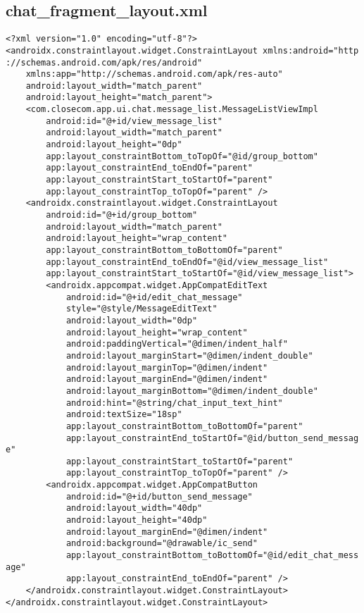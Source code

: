 \documentclass[listing]{espd}
\begin{document}
\subsection{chat\_fragment\_layout.xml}
\begin{verbatim}
<?xml version="1.0" encoding="utf-8"?>
<androidx.constraintlayout.widget.ConstraintLayout xmlns:android="http
://schemas.android.com/apk/res/android"
    xmlns:app="http://schemas.android.com/apk/res-auto"
    android:layout_width="match_parent"
    android:layout_height="match_parent">
    <com.closecom.app.ui.chat.message_list.MessageListViewImpl
        android:id="@+id/view_message_list"
        android:layout_width="match_parent"
        android:layout_height="0dp"
        app:layout_constraintBottom_toTopOf="@id/group_bottom"
        app:layout_constraintEnd_toEndOf="parent"
        app:layout_constraintStart_toStartOf="parent"
        app:layout_constraintTop_toTopOf="parent" />
    <androidx.constraintlayout.widget.ConstraintLayout
        android:id="@+id/group_bottom"
        android:layout_width="match_parent"
        android:layout_height="wrap_content"
        app:layout_constraintBottom_toBottomOf="parent"
        app:layout_constraintEnd_toEndOf="@id/view_message_list"
        app:layout_constraintStart_toStartOf="@id/view_message_list">
        <androidx.appcompat.widget.AppCompatEditText
            android:id="@+id/edit_chat_message"
            style="@style/MessageEditText"
            android:layout_width="0dp"
            android:layout_height="wrap_content"
            android:paddingVertical="@dimen/indent_half"
            android:layout_marginStart="@dimen/indent_double"
            android:layout_marginTop="@dimen/indent"
            android:layout_marginEnd="@dimen/indent"
            android:layout_marginBottom="@dimen/indent_double"
            android:hint="@string/chat_input_text_hint"
            android:textSize="18sp"
            app:layout_constraintBottom_toBottomOf="parent"
            app:layout_constraintEnd_toStartOf="@id/button_send_messag
e"
            app:layout_constraintStart_toStartOf="parent"
            app:layout_constraintTop_toTopOf="parent" />
        <androidx.appcompat.widget.AppCompatButton
            android:id="@+id/button_send_message"
            android:layout_width="40dp"
            android:layout_height="40dp"
            android:layout_marginEnd="@dimen/indent"
            android:background="@drawable/ic_send"
            app:layout_constraintBottom_toBottomOf="@id/edit_chat_mess
age"
            app:layout_constraintEnd_toEndOf="parent" />
    </androidx.constraintlayout.widget.ConstraintLayout>
</androidx.constraintlayout.widget.ConstraintLayout>
\end{verbatim}
\end{document}

